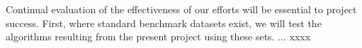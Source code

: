 Continual evaluation of the effectiveness of our efforts will be essential to project success.
First, where standard benchmark datasets exist, we will test the algorithms resulting from the present project using these sets.
... xxxx